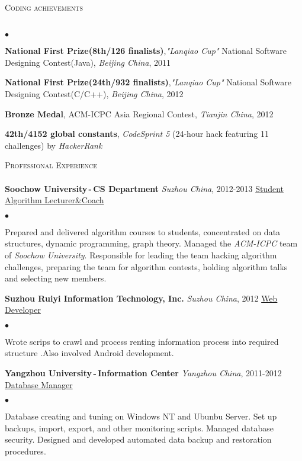 \documentclass[11pt]{article}
\newcommand{\place}{\emph}
\newcommand{\specialname}{\textit}
\newcommand{\honor}{\textbf}
\newcommand{\lineunder}{\vspace*{-8pt} \\ \hspace*{-18pt} \hrulefill \\}
\newcommand{\header}[2]{{\hspace*{-15pt}\vspace*{6pt} \textsc{\large #1}\hfill{\footnotesize #2}} \vspace*{-6pt} \lineunder}
\newcommand{\employer}[4]{{ \textbf{#1} \emph{#2}, #3 \hfill \underline{#4}\\ }}
\newenvironment{achievements}{\begin{list}{$\bullet$}{\topsep 0pt \itemsep -2pt}}{\vspace*{2pt}\end{list}}
\begin{document}
\header{Coding achievements}{}
\begin{achievements} \begin{footnotesize}
    \item \honor{National First Prize(8th/126 finalists)},\specialname{"Lanqiao Cup"} National Software Designing Contest(Java), \place{Beijing China}, 2011
    \item \honor{National First Prize(24th/932 finalists)},\specialname{"Lanqiao Cup"} National Software Designing Contest(C/C++), \place{Beijing China}, 2012
    \item \honor{Bronze Medal}, ACM-ICPC Asia Regional Contest, \place{Tianjin China}, 2012
    \item \honor{42th/4152 global constants}, \emph{CodeSprint 5} (24-hour hack featuring 11 challenges) by \emph{HackerRank}
\end{footnotesize} \end{achievements}

\header{Professional Experience}{}

\employer{Soochow University\,-\,CS Department}{Suzhou China}{2012-2013} {Student Algorithm Lecturer\&Coach}
	\begin{achievements}
    \item Prepared and delivered algorithm courses to students, concentrated on
        data structures, dynamic programming, graph theory. Managed the \emph{ACM-ICPC} team of \emph{Soochow University}. Responsible for leading the team hacking algorithm
        challenges, preparing the team for algorithm contests, holding algorithm talks and selecting new members.
	\end{achievements}

\employer{Suzhou Ruiyi Information Technology, Inc.}{Suzhou China}{2012}{Web Developer}
	\begin{achievements}
        \item Wrote scrips to crawl and process renting information process into required structure .Also involved Android development.
	\end{achievements}

\employer{Yangzhou University\,-\,Information Center}{Yangzhou China}{2011-2012}{Database Manager}
	\begin{achievements}
    \item Database creating and tuning on Windows NT and Ubunbu Server. Set up backups, import, export, and other monitoring scripts.  Managed database security. Designed and developed automated data backup and restoration procedures.

	\end{achievements}
\end{document}
